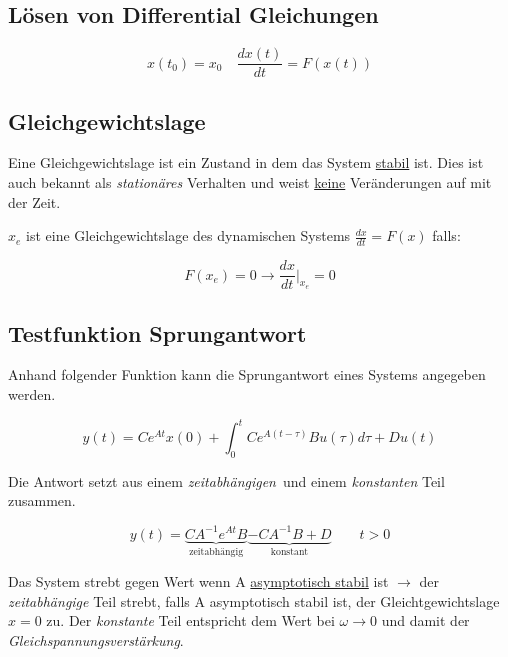 \documentclass[
  10pt,
  a4paper,
  twocolumn]{article}
\numberwithin{equation}{section}
\begin{document}
\subsection{Lösen von Differential
Gleichungen}\label{luxf6sen-von-differential-gleichungen}

\begin{tcolorbox}[enhanced jigsaw, coltitle=black, colback=white, breakable, colframe=quarto-callout-important-color-frame, rightrule=.15mm, left=2mm, opacityback=0, leftrule=.75mm, toptitle=1mm, colbacktitle=quarto-callout-important-color!10!white, bottomtitle=1mm, arc=.35mm, bottomrule=.15mm, title=\textcolor{quarto-callout-important-color}{\faExclamation}\hspace{0.5em}{Lösung einer Differentialgleichung}, titlerule=0mm, toprule=.15mm, opacitybacktitle=0.6]

\[
x(t_0)=x_0\quad\frac{dx(t)}{dt}=F(x(t))
\]

\end{tcolorbox}

\subsection{Gleichgewichtslage}\label{gleichgewichtslage}

Eine Gleichgewichtslage ist ein Zustand in dem das System \ul{stabil}
ist. Dies ist auch bekannt als \emph{stationäres} Verhalten und weist
\ul{keine} Veränderungen auf mit der Zeit.

\(x_e\) ist eine Gleichgewichtslage des dynamischen Systems
\(\frac{dx}{dt}=F(x)\) falls:

\[
F(x_e)=0 \rightarrow \frac{dx}{dt}\biggr\rvert_{x_e}=0
\]

\subsection{Testfunktion
Sprungantwort}\label{testfunktion-sprungantwort}

Anhand folgender Funktion kann die Sprungantwort eines Systems angegeben
werden.

\[
y(t)=Ce^{At}x(0)+\int^t_0Ce^{A(t-\tau)}Bu(\tau)d\tau+Du(t)
\]

Die Antwort setzt aus einem \emph{zeitabhängigen}~und einem
\emph{konstanten} Teil zusammen.

\[
y(t)=\underbrace{CA^{-1}e^{At}B}_{\text{zeitabhängig}}\underbrace{-CA^{-1}B+D}_{\text{konstant}}\qquad t>0
\]

Das System strebt gegen Wert wenn A \ul{asymptotisch stabil} ist
\(\rightarrow\) der \emph{zeitabhängige} Teil strebt, falls A
asymptotisch stabil ist, der Gleichtgewichtslage \(x=0\) zu. Der
\emph{konstante} Teil entspricht dem Wert bei \(\omega\rightarrow 0\)
und damit der \emph{Gleichspannungsverstärkung}.
\end{document}

